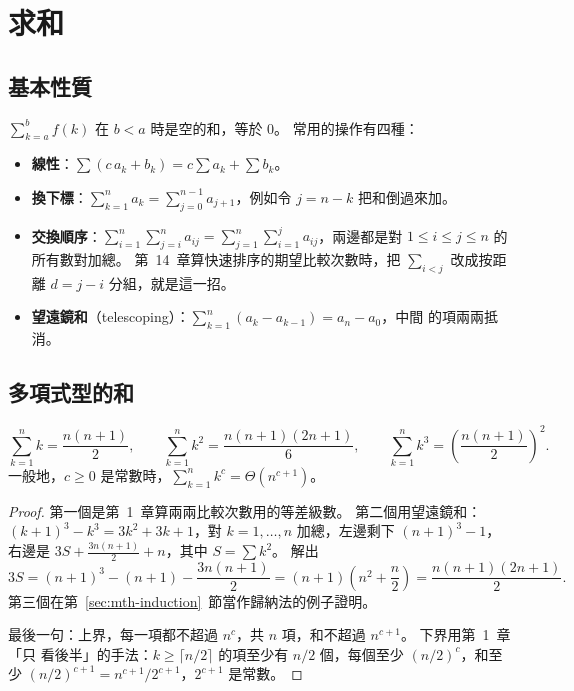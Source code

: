 \section{求和}
\label{sec:mth-sum}

\subsection{基本性質}

$\sum_{k=a}^{b} f(k)$ 在 $b < a$ 時是空的和，等於 $0$。 常用的操作有四種：

\begin{itemize}
\item \textbf{線性}：$\sum (c\,a_k + b_k) = c \sum a_k + \sum b_k$。
\item \textbf{換下標}：$\sum_{k=1}^{n} a_{k} = \sum_{j=0}^{n-1} a_{j+1}$，例如令 $j = n - k$
把和倒過來加。
\item \textbf{交換順序}：$\displaystyle\sum_{i=1}^{n} \sum_{j=i}^{n} a_{ij}
= \sum_{j=1}^{n} \sum_{i=1}^{j} a_{ij}$，兩邊都是對 $1 \le i \le j \le n$ 的所有數對加總。
第~14~章算快速排序的期望比較次數時，把 $\sum_{i<j}$ 改成按距離 $d = j - i$ 分組，就是這一招。
\item \textbf{望遠鏡和}（telescoping）：$\sum_{k=1}^{n} (a_k - a_{k-1}) = a_n - a_0$，中間
的項兩兩抵消。
\end{itemize}

\subsection{多項式型的和}

\begin{theorem}
\label{thm:mth-powsum}
\[
\sum_{k=1}^{n} k = \frac{n(n+1)}{2}, \qquad
\sum_{k=1}^{n} k^2 = \frac{n(n+1)(2n+1)}{6}, \qquad
\sum_{k=1}^{n} k^3 = \left(\frac{n(n+1)}{2}\right)^2 .
\]
一般地，$c \ge 0$ 是常數時，$\sum_{k=1}^{n} k^c = \Theta(n^{c+1})$。
\end{theorem}

\begin{proof}
第一個是第~1~章算兩兩比較次數用的等差級數。 第二個用望遠鏡和：$(k+1)^3 - k^3 = 3k^2 +
3k + 1$，對 $k = 1, \ldots, n$ 加總，左邊剩下 $(n+1)^3 - 1$，右邊是 $3S + \frac{3n(n+1)}{2}
+ n$，其中 $S = \sum k^2$。 解出
\[
3S = (n+1)^3 - (n+1) - \frac{3n(n+1)}{2} = (n+1)\left(n^2 + \frac{n}{2}\right)
= \frac{n(n+1)(2n+1)}{2}.
\]
第三個在第~\ref{sec:mth-induction}~節當作歸納法的例子證明。

最後一句：上界，每一項都不超過 $n^c$，共 $n$ 項，和不超過 $n^{c+1}$。 下界用第~1~章「只
看後半」的手法：$k \ge \lceil n/2 \rceil$ 的項至少有 $n/2$ 個，每個至少 $(n/2)^c$，和至少
$(n/2)^{c+1} = n^{c+1} / 2^{c+1}$，$2^{c+1}$ 是常數。
\end{proof}

